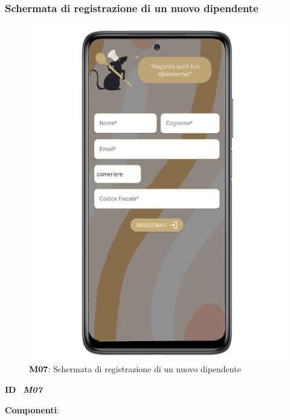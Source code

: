         \subsubsection{Schermata di registrazione di un nuovo dipendente}
        \begin{figure}[H]
            \centering
            \includegraphics[scale=1.8]{assets/Mockup/Mockup_SaveWorker.png}
            \caption{\textbf{M07}: Schermata di registrazione di un nuovo dipendente}\label{fig:Mockup_SaveWaiter}
        \end{figure}
        \begin{flushleft}
            \textbf{ID} \ \Large{\textit{\textbf{M07}}}
        \end{flushleft}
        \textbf{Componenti}:

